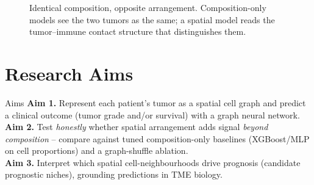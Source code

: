 \documentclass[11pt]{article}
\begin{document}
\begin{figure}[h]
\centering
{}
\caption{Identical composition, opposite arrangement. Composition-only models
see the two tumors as the same; a spatial model reads the tumor--immune contact
structure that distinguishes them.}
\label{fig:mechanism}
\end{figure}

\section{Research Aims}

\begin{aimbox}{Aims}
\textbf{Aim 1.} Represent each patient's tumor as a spatial cell graph and
predict a clinical outcome (tumor grade and/or survival) with a graph neural
network.\\
\textbf{Aim 2.} Test \emph{honestly} whether spatial arrangement adds signal
\emph{beyond composition} -- compare against tuned composition-only baselines
(XGBoost/MLP on cell proportions) and a graph-shuffle ablation.\\
\textbf{Aim 3.} Interpret which spatial cell-neighbourhoods drive prognosis
(candidate prognostic niches), grounding predictions in TME biology.
\end{aimbox}
\end{document}

